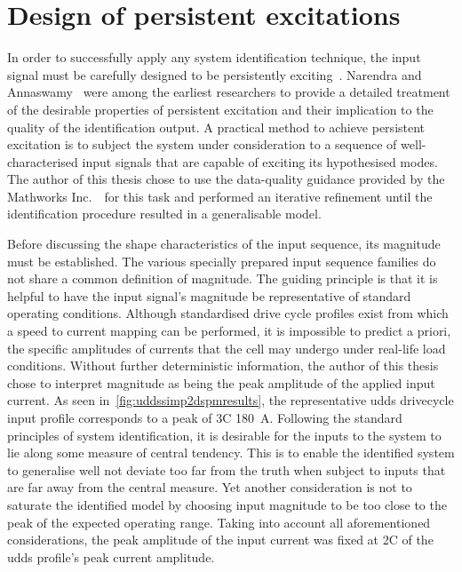 \section{Design of persistent excitations}
In order  to successfully apply  any system identification technique,  the input
signal must be carefully  designed to be persistently exciting~\cite{Ljung1999}.
Narendra and Annaswamy~\cite{Narendra1984,Narendra1987}  were among the earliest
researchers  to provide  a detailed  treatment  of the  desirable properties  of
persistent excitation and their implication to the quality of the identification
output. A  practical method to achieve  persistent excitation is to  subject the
system under  consideration to  a sequence  of well-characterised  input signals
that  are  capable of  exciting  its  hypothesised  modes.  The author  of  this
thesis  chose  to  use  the  data-quality guidance  provided  by  the  Mathworks
Inc.~\cite{mathworkssysid}\ for this task  and performed an iterative refinement
until the identification procedure resulted in a generalisable model.

Before discussing the shape characteristics of the input sequence, its magnitude
must be established.  The various specially prepared input  sequence families do
not share a common definition of magnitude.  The guiding principle is that it is
helpful  to have  the input  signal's  magnitude be  representative of  standard
operating  conditions. Although  standardised  drive cycle  profiles exist  from
which a speed to current mapping can be performed, it is impossible to predict a
priori, the  specific amplitudes  of currents  that the  cell may  undergo under
real-life load conditions. Without further deterministic information, the author
of  this thesis  chose to  interpret magnitude  as being  the peak  amplitude of
the  applied  input  current. As  seen  in~\cref{fig:uddssimp2dspmresults},  the
representative  \gls{udds}  drivecycle  input  profile  corresponds  to  a  peak
of  3C \ie{}  \SI{180}{\ampere}.  Following the  standard  principles of  system
identification, it is desirable  for the inputs to the system  to lie along some
measure  of  central tendency.  This  is  to  enable  the identified  system  to
generalise well \ie{} not deviate too far  from the truth when subject to inputs
that are far away from the central  measure. Yet another consideration is not to
saturate the identified model by choosing input magnitude to be too close to the
peak of  the expected  operating range. Taking  into account  all aforementioned
considerations, the  peak amplitude of the  input current was fixed  at 2C \ie{}
 of the \gls{udds} profile's peak current amplitude.

